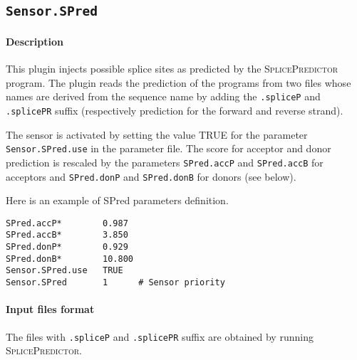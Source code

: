 
\subsection{\texttt{Sensor.SPred}}

\paragraph{Description}

This plugin injects possible splice sites as predicted by the
\textsc{SplicePredictor} program. The plugin reads the prediction of
the programs from two files whose names are derived from the sequence
name by adding the \texttt{.spliceP} and \texttt{.splicePR} suffix
(respectively prediction for the forward and reverse strand).

The sensor is activated by setting the value TRUE for the parameter
\texttt{Sensor.SPred.use} in the parameter file. The score for acceptor
and donor prediction is rescaled by the parameters {\tt SPred.accP} and
{\tt SPred.accB} for acceptors and {\tt SPred.donP} and {\tt SPred.donB} for
donors (see below).

Here is an example of SPred parameters definition.
\begin{Verbatim}[fontsize=\small]
SPred.accP*        0.987
SPred.accB*        3.850
SPred.donP*        0.929
SPred.donB*        10.800
Sensor.SPred.use   TRUE
Sensor.SPred       1      # Sensor priority
\end{Verbatim}

\paragraph{Input files format}

The files with \texttt{.spliceP} and \texttt{.splicePR} suffix are
obtained by running \textsc{SplicePredictor}.

